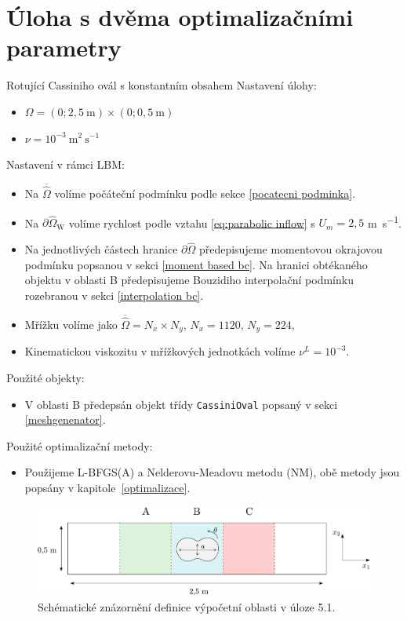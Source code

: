 \section{Úloha s dvěma optimalizačními parametry}
\begin{uloha}{Rotující Cassiniho ovál s konstantním obsahem}\label{ulo:3}
	\vspace{2mm}
	Nastavení úlohy:
	\begin{itemize}
		\item $ \Omega=(0 ; 2{,}5 \mathrm{~m}) \times(0 ; 0{,}5 \mathrm{~m})$
		\item $ \nu=10^{-3} \mathrm{~m}^{2} \mathrm{~s}^{-1}$
	\end{itemize} 
	Nastavení v rámci LBM:
	\begin{itemize}
		\item Na $ \overline{\hat{\Omega}} $ volíme počáteční podmínku podle sekce \ref{pocatecni podminka}.
		\item Na $ \partial \hat{\Omega}_{\mathrm{W}} $ volíme rychlost podle vztahu \eqref{eq:parabolic inflow} s $ U_m = 2{,}5 $ \si{m s^{-1}}.
		\item Na jednotlivých částech hranice $ \partial \hat{\Omega}$ předepisujeme momentovou okrajovou podmínku popsanou v sekci \ref{moment based bc}. Na hranici obtékaného objektu v oblasti B předepisujeme Bouzidiho interpolační podmínku rozebranou v sekci \ref{interpolation bc}.
		\item Mřížku volíme jako $\overline{\hat{\Omega}} = N_{x} \times N_{y}$, $N_{x} = 1120, \, N_{y} = 224$,
		\item Kinematickou viskozitu v mřížkových jednotkách volíme $\nu^{L} = 10^{-3} $.
	\end{itemize}
	Použité objekty:
	\begin{itemize}
		\item V oblasti B předepsán objekt třídy \texttt{CassiniOval} popsaný v sekci \ref{meshgenenator}.
	\end{itemize} 
	Použité optimalizační metody:
	\begin{itemize}
		\item Použijeme L-BFGS(A) a Nelderovu-Meadovu metodu (NM), obě metody jsou popsány v kapitole~\ref{optimalizace}.
	\end{itemize} 
\end{uloha}

\begin{figure}[H]
	\centering
	\vspace{8mm}
	\includegraphics[width=1.0	\textwidth]{Images/cassini.pdf}
	\vspace{2mm}
	\caption{Schématické znázornění definice výpočetní oblasti v úloze 5.1.}
	\label{fig:cassini oblast}
	\vspace{1.8mm}
\end{figure}


